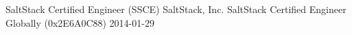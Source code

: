 \awarditem
    {SaltStack Certified Engineer (SSCE)}
    {SaltStack, Inc.}
    { SaltStack Certified Engineer Globally (0x2E6A0C88)}
    {2014-01-29}

